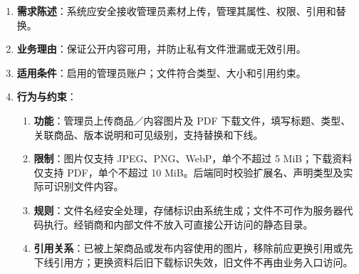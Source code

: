 \begin{enumerate}
\item {\bfseries 需求陈述}：系统应安全接收管理员素材上传，管理其属性、权限、引用和替换。
\item {\bfseries 业务理由}：保证公开内容可用，并防止私有文件泄漏或无效引用。
\item {\bfseries 适用条件}：启用的管理员账户；文件符合类型、大小和引用约束。
\item {\bfseries 行为与约束}：
\begin{enumerate}
\item {\bfseries 功能}：管理员上传商品／内容图片及 PDF 下载文件，填写标题、类型、关联商品、版本说明和可见级别，支持替换和下线。
\item {\bfseries 限制}：图片仅支持 JPEG、PNG、WebP，单个不超过 5 MiB；下载资料仅支持 PDF，单个不超过 10 MiB。后端同时校验扩展名、声明类型及实际可识别文件内容。
\item {\bfseries 规则}：文件名经安全处理，存储标识由系统生成；文件不可作为服务器代码执行。经销商和内部文件不放入可直接公开访问的静态目录。
\item {\bfseries 引用关系}：已被上架商品或发布内容使用的图片，移除前应更换引用或先下线引用方；更换资料后旧下载标识失效，旧文件不再由业务入口访问。
\end{enumerate}

\end{enumerate}


